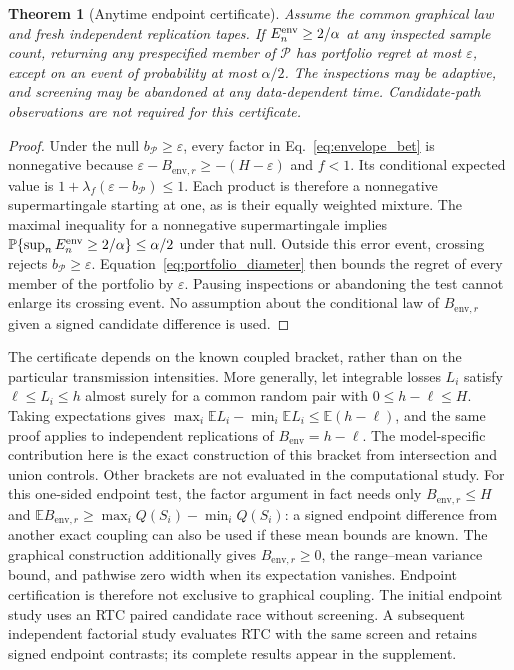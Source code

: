 \documentclass[preprint,11pt,sort&compress]{elsarticle}
\newtheorem{theorem}{Theorem}
\newcommand{\E}{\mathbb E}
\newcommand{\Prob}{\mathbb{P}}
\begin{document}
\begin{theorem}[Anytime endpoint certificate]
\label{thm:endpoint_certificate}
Assume the common graphical law and fresh independent replication tapes.
If $E_n^{\rm env}\ge2/\alpha$ at any inspected sample count, returning any
prespecified member of $\mathcal P$ has portfolio regret at most
$\varepsilon$, except on an event of probability at most $\alpha/2$.
The inspections may be adaptive, and screening may be abandoned at any
data-dependent time. Candidate-path observations are not required for this
certificate.
\end{theorem}
\begin{proof}
Under the null $b_{\mathcal P}\ge\varepsilon$, every factor in
Eq.~\ref{eq:envelope_bet} is nonnegative because
$\varepsilon-B_{\mathrm{env},r}\ge-(H-\varepsilon)$ and $f<1$. Its conditional expected
value is $1+\lambda_f(\varepsilon-b_{\mathcal P})\le1$. Each product is
therefore a nonnegative supermartingale starting at one, as is their
equally weighted mixture. The maximal inequality for a nonnegative
supermartingale implies
$\Prob\{\sup_n E_n^{\rm env}\ge2/\alpha\}\le\alpha/2$ under that null.
Outside this error event, crossing rejects $b_{\mathcal P}\ge\varepsilon$.
Equation~\ref{eq:portfolio_diameter} then bounds the regret of every member
of the portfolio by $\varepsilon$. Pausing inspections or abandoning the
test cannot enlarge its crossing event. No assumption about the
conditional law of $B_{\mathrm{env},r}$ given a signed candidate difference is used.
\end{proof}

The certificate depends on the known coupled bracket, rather than on the
particular transmission intensities. More generally, let integrable losses
$L_i$ satisfy $\ell\le L_i\le h$ almost surely for a common random pair
with $0\le h-\ell\le H$. Taking expectations gives
$\max_i\E L_i-\min_i\E L_i\le\E(h-\ell)$, and the same proof applies to
independent replications of $B_{\mathrm{env}}=h-\ell$. The model-specific contribution
here is the exact construction of this bracket from intersection and union
controls. Other brackets are not evaluated in the computational study.
For this one-sided endpoint test, the factor argument in fact needs only
$B_{\mathrm{env},r}\le H$ and $\E B_{\mathrm{env},r}\ge\max_iQ(S_i)-\min_iQ(S_i)$: a signed endpoint
difference from another exact coupling can also be used if these mean bounds
are known. The graphical construction additionally gives $B_{\mathrm{env},r}\ge0$, the
range--mean variance bound, and pathwise zero width when its expectation
vanishes. Endpoint certification is therefore not exclusive to graphical
coupling. The initial endpoint study uses an RTC paired candidate race without screening. A subsequent independent factorial study evaluates RTC with the same screen and retains signed endpoint contrasts; its complete results appear in the supplement.
\end{document}
